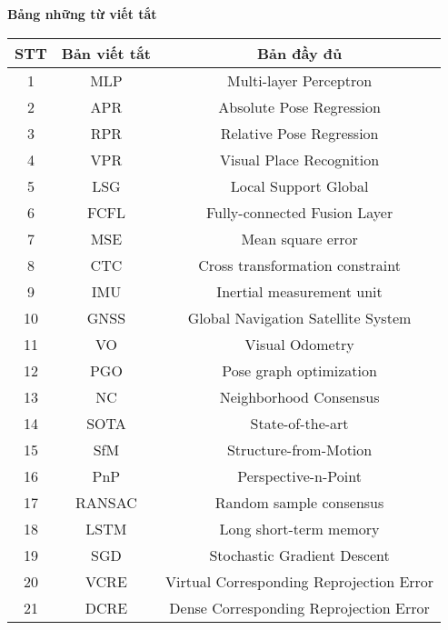 \titlepage \null
	\small
	\begin{center}
	  {\bfseries Bảng những từ viết tắt\vspace{-.5em}}
	\end{center}
	\quotation
\begin{table}[h]
\centering
\begin{tabular}{|c|c|c|}
\hline
\textbf{STT} & \textbf{Bản viết tắt}                & \textbf{Bản đầy đủ}     \\ \hline
1            & MLP                  & Multi-layer Perceptron        \\ \hline
2            & APR                  & Absolute Pose Regression      \\ \hline
3            & RPR                  & Relative Pose Regression      \\ \hline
4            & VPR                  & Visual Place Recognition      \\ \hline
5            & LSG                  & Local Support Global          \\ \hline
6            & FCFL                 & Fully-connected Fusion Layer  \\ \hline
7            & MSE                  & Mean square error             \\ \hline
8            & CTC                  & Cross transformation constraint \\ \hline
9		& IMU		& Inertial measurement unit	\\ \hline
10		& GNSS		& Global Navigation Satellite System \\ \hline
11		& VO			& Visual Odometry	\\ \hline
12      & PGO       & Pose graph optimization   \\ \hline
13	 & NC 	 & Neighborhood Consensus	\\ \hline
14 		& SOTA		& State-of-the-art \\ \hline
15		& SfM 		& Structure-from-Motion \\ \hline
16		& PnP		& Perspective-n-Point \\ \hline
17 		& RANSAC	& Random sample consensus \\ \hline
18		& LSTM		& Long short-term memory \\ \hline
19 		& SGD		& Stochastic Gradient Descent \\ \hline
20		& VCRE		& Virtual Corresponding Reprojection Error \\ \hline
21 		& DCRE		& Dense Corresponding Reprojection Error \\ \hline
\end{tabular}
\end{table}

